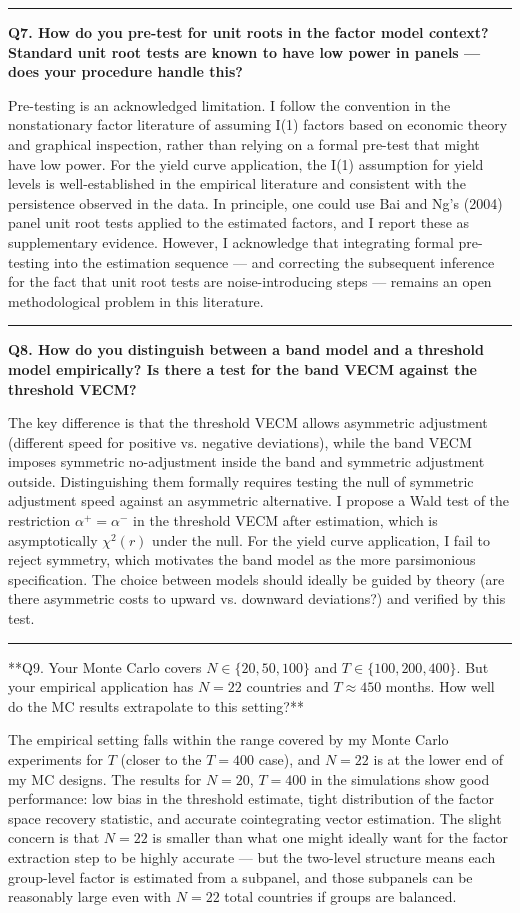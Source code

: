 \documentclass[11pt,a4paper]{article}
\begin{document}
\medskip\hrule\medskip

\textbf{Q7. How do you pre-test for unit roots in the factor model context? Standard unit root tests are known to have low power in panels — does your procedure handle this?}

Pre-testing is an acknowledged limitation. I follow the convention in the nonstationary factor literature of assuming I(1) factors based on economic theory and graphical inspection, rather than relying on a formal pre-test that might have low power. For the yield curve application, the I(1) assumption for yield levels is well-established in the empirical literature and consistent with the persistence observed in the data. In principle, one could use Bai and Ng's (2004) panel unit root tests applied to the estimated factors, and I report these as supplementary evidence. However, I acknowledge that integrating formal pre-testing into the estimation sequence — and correcting the subsequent inference for the fact that unit root tests are noise-introducing steps — remains an open methodological problem in this literature.

\medskip\hrule\medskip

\textbf{Q8. How do you distinguish between a band model and a threshold model empirically? Is there a test for the band VECM against the threshold VECM?}

The key difference is that the threshold VECM allows asymmetric adjustment (different speed for positive vs. negative deviations), while the band VECM imposes symmetric no-adjustment inside the band and symmetric adjustment outside. Distinguishing them formally requires testing the null of symmetric adjustment speed against an asymmetric alternative. I propose a Wald test of the restriction $\alpha^+ = \alpha^-$ in the threshold VECM after estimation, which is asymptotically $\chi^2(r)$ under the null. For the yield curve application, I fail to reject symmetry, which motivates the band model as the more parsimonious specification. The choice between models should ideally be guided by theory (are there asymmetric costs to upward vs. downward deviations?) and verified by this test.

\medskip\hrule\medskip

**Q9. Your Monte Carlo covers $N \in \{20, 50, 100\}$ and $T \in \{100, 200, 400\}$. But your empirical application has $N = 22$ countries and $T \approx 450$ months. How well do the MC results extrapolate to this setting?**

The empirical setting falls within the range covered by my Monte Carlo experiments for $T$ (closer to the $T = 400$ case), and $N = 22$ is at the lower end of my MC designs. The results for $N = 20$, $T = 400$ in the simulations show good performance: low bias in the threshold estimate, tight distribution of the factor space recovery statistic, and accurate cointegrating vector estimation. The slight concern is that $N = 22$ is smaller than what one might ideally want for the factor extraction step to be highly accurate — but the two-level structure means each group-level factor is estimated from a subpanel, and those subpanels can be reasonably large even with $N = 22$ total countries if groups are balanced.
\end{document}
